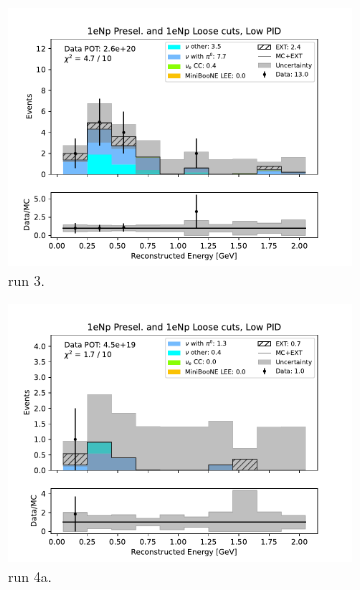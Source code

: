 \begin{figure}
\begin{subfigure}{0.33\linewidth}
        \includegraphics[width=\linewidth]{technote/Sidebands/Figures/FarSideband/far_sideband_reco_e_run3_NP_NPL_LOW_PID.pdf}
        \caption{run 3.}
    \end{subfigure}
    \begin{subfigure}{0.33\linewidth}
        \includegraphics[width=\linewidth]{technote/Sidebands/Figures/FarSideband/far_sideband_reco_e_run4a_NP_NPL_LOW_PID.pdf}
        \caption{run 4a.}
    \end{subfigure}%
    \begin{subfigure}{0.33\linewidth}

\end{subfigure}
\end{figure}
